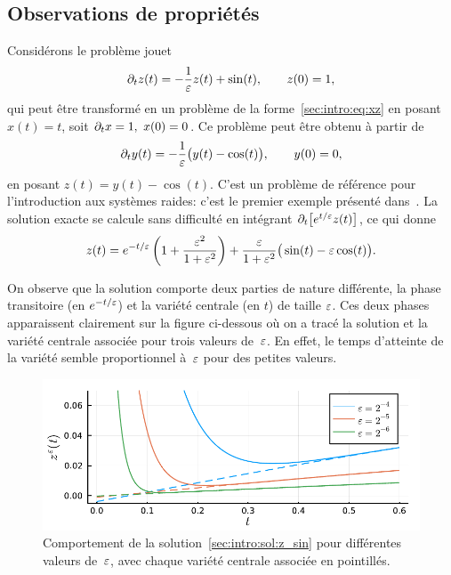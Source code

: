 \subsection*{Observations de propriétés}


Considérons le problème jouet
\begin{equation} \label{sec:intro:pb:z_sin}
    \partial_t z(t) = -\frac{1}{\varepsilon}z(t) + \sin(t), 
    \qquad
    z(0) = 1, 
\end{equation}
qui peut être transformé en un problème de la forme~\eqref{sec:intro:eq:xz} en posant $x(t) = t$, soit $\partial_t x = 1,\ x(0) = 0$. Ce problème peut être obtenu à partir de 
\begin{equation*}
    \partial_t y(t) = -\frac{1}{\varepsilon} \big( y(t) - \cos(t) \big), 
    \qquad
    y(0) = 0, 
\end{equation*}
en posant $z(t) = y(t) - \cos(t)$. C'est un problème de référence pour l'introduction aux systèmes raides: c'est le premier exemple présenté dans~\cite{hairer.1996.solving}. La solution exacte se calcule sans difficulté en intégrant $\partial_t \big[ e^{t/\varepsilon} z(t) \big]$, ce qui donne 
\begin{equation} \label{sec:intro:sol:z_sin}
    z(t) = e^{-t/\varepsilon} \left( 1 + \frac{\varepsilon^2}{1+\varepsilon^2} \right)
        + \frac{\varepsilon}{1 + \varepsilon^2} \big( \sin(t) - \varepsilon \cos(t) \big) .
\end{equation}

On observe que la solution comporte deux parties de nature différente, la phase transitoire (en $e^{-t/\varepsilon}$) et la variété centrale (en $t$) de taille $\varepsilon$. Ces deux phases apparaissent clairement sur la figure ci-dessous où on a tracé la solution et la variété centrale associée pour trois valeurs de~$\varepsilon$. En effet, le temps d'atteinte de la variété semble proportionnel à~$\varepsilon$ pour des petites valeurs. 
%
\begin{figure}[!ht]
    \centering
    \includegraphics{./Presentation/z_sin.pdf}
    \caption{Comportement de la solution~\eqref{sec:intro:sol:z_sin} pour différentes valeurs de~$\varepsilon$, avec chaque variété centrale associée en pointillés.}
\end{figure}

